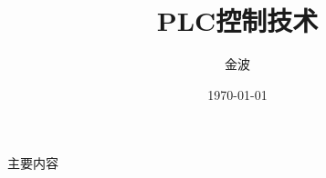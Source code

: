 \documentclass[14pt,CJKutf8]{beamer}
\begin{document}
\begin{CJK}{UTF8}{song}
\title{PLC控制技术}
\author{金波 }
\date{\today}
\begin{frame}
\titlepage
\end{frame}
\begin{frame}[allowframebreaks]{主要内容}
  \tableofcontents
\end{frame}




\end{CJK}
\end{document}
